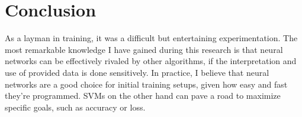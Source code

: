 \chapter{Conclusion}
As a layman in training, it was a difficult but entertaining experimentation.
The most remarkable knowledge I have gained during this research is that neural networks can 
be effectively rivaled by other algorithms, if the interpretation and use of provided data is done 
sensitively.
In practice, I believe that neural networks are a good choice for initial training setups, given how easy and fast they're programmed. 
SVMs on the other hand can pave a road to maximize specific goals, such as accuracy or loss.

